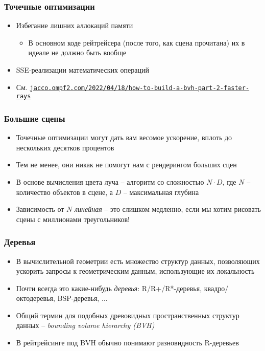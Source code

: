 \documentclass[10pt]{beamer}
\begin{document}
\begin{frame}[fragile]
\frametitle{Точечные оптимизации}
\begin{itemize}
\item Избегание лишних аллокаций памяти
\pause
\begin{itemize}
\item В основном коде рейтрейсера (после того, как сцена прочитана) их в идеале не должно быть вообще
\end{itemize}
\pause
\item SSE-реализации математических операций
\pause
\item См. \href{https://jacco.ompf2.com/2022/04/18/how-to-build-a-bvh-part-2-faster-rays/}{\texttt{jacco.ompf2.com/2022/04/18/how-to-build-a-bvh-part-2-faster-rays}}
\end{itemize}
\end{frame}

\begin{frame}[fragile]
\frametitle{Большие сцены}
\begin{itemize}
\item Точечные оптимизации могут дать вам весомое ускорение, вплоть до нескольких десятков процентов
\pause
\item Тем не менее, они никак не помогут нам с рендерингом больших сцен
\pause
\item В основе вычисления цвета луча -- алгоритм со сложностью \begin{math}N \cdot D\end{math}, где \begin{math}N\end{math} -- количество объектов в сцене, а \begin{math}D\end{math} -- максимальная глубина
\pause
\item Зависимость от \begin{math}N\end{math} \textit{линейная} -- это слишком медленно, если мы хотим рисовать сцены с миллионами треугольников!
\end{itemize}
\end{frame}

\begin{frame}[fragile]
\frametitle{Деревья}
\begin{itemize}
\item В вычислительной геометрии есть множество структур данных, позволяющих ускорить запросы к геометрическим данным, использующие их локальность
\pause
\item Почти всегда это какие-нибудь \textit{деревья}: R/R+/R*-деревья, квадро/октодеревья, BSP-деревья, \begin{math}\dots\end{math}
\pause
\item Общий термин для подобных древовидных пространственных структур данных -- \textit{bounding volume hierarchy (BVH)}
\pause
\item В рейтрейсинге под BVH обычно понимают разновидность R-деревьев
\end{itemize}
\end{frame}
\end{document}
